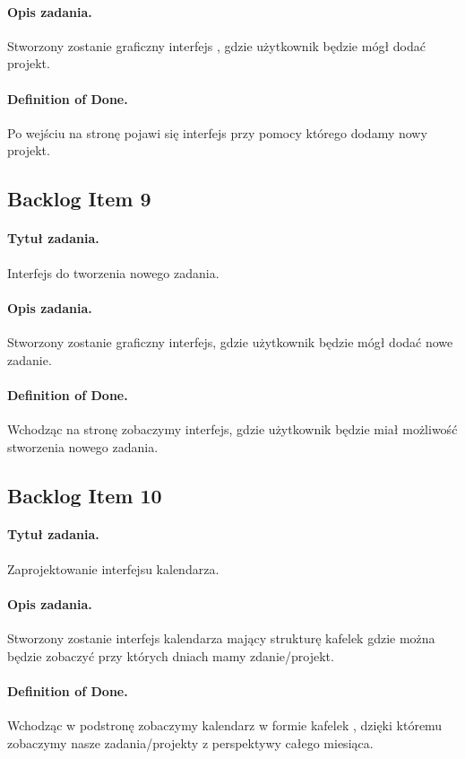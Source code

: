 \documentclass[a4paper]{article}
\begin{document}
\paragraph{Opis zadania.} Stworzony zostanie graficzny interfejs , gdzie użytkownik będzie mógł dodać projekt.
\paragraph{Definition of Done.} Po wejściu na stronę pojawi się interfejs przy pomocy którego dodamy nowy projekt.

\subsection{Backlog Item 9} 
\paragraph{Tytuł zadania.} Interfejs do tworzenia nowego zadania.
\paragraph{Opis zadania.} Stworzony zostanie graficzny interfejs, gdzie użytkownik będzie mógł dodać nowe zadanie.
\paragraph{Definition of Done.} Wchodząc na stronę zobaczymy interfejs, gdzie użytkownik będzie miał możliwość stworzenia nowego zadania.

\subsection{Backlog Item 10} 
\paragraph{Tytuł zadania.} Zaprojektowanie interfejsu kalendarza.
\paragraph{Opis zadania.} Stworzony zostanie interfejs kalendarza mający strukturę kafelek gdzie można będzie zobaczyć przy których dniach mamy zdanie/projekt.
\paragraph{Definition of Done.} Wchodząc w podstronę zobaczymy kalendarz w formie kafelek , dzięki któremu zobaczymy nasze zadania/projekty z perspektywy całego miesiąca.
\end{document}
